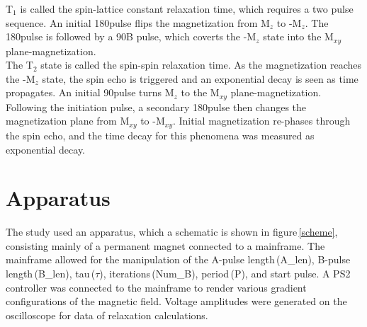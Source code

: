 \documentclass[aps,prl,twocolumn,superscriptaddress,nofootinbib]{revtex4-1}
\begin{document}
T$_1$ is called the spin-lattice constant relaxation time, which requires a two pulse sequence. An initial 180\degree pulse flips the magnetization from M$_z$ to -M$_z$. The 180\degree pulse is followed by a 90\degree B pulse, which coverts the -M$_z$ state into the M$_{xy}$ plane-magnetization.
\\
\indent The T$_2$ state is called the spin-spin relaxation time. As the magnetization reaches the -M$_z$ state, the spin echo is triggered and an exponential decay is seen as time propagates. An initial 90\degree pulse turns M$_z$ to the M$_{xy}$ plane-magnetization. Following the initiation pulse, a secondary 180\degree pulse then changes the magnetization plane from M$_{xy}$ to -M$_{xy}$. Initial magnetization re-phases through the spin echo, and the time decay for this phenomena was measured as exponential decay.




\section{Apparatus}
The study used an apparatus, which a schematic is shown in figure\,\ref{scheme}, consisting mainly of a permanent magnet connected to a mainframe. The mainframe allowed for the manipulation of the A-pulse length\,(A\_len), B-pulse length\,(B\_len), tau\,($\tau$), iterations\,(Num\_B), period\,(P), and start pulse. A PS2 controller was connected to the mainframe to render various gradient configurations of the magnetic field. Voltage amplitudes were generated on the oscilloscope for data of relaxation calculations.
\end{document}
